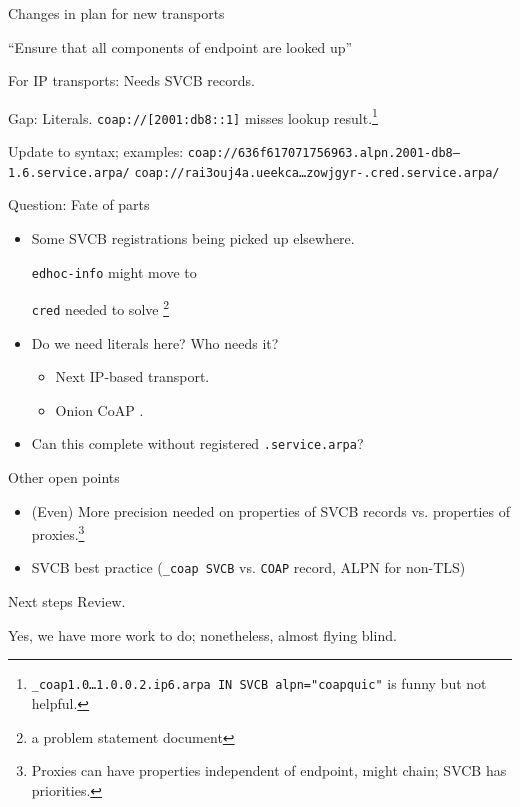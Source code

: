 \begin{frame}{Changes in plan for new transports}\Large
    {\color{gray}
    ``Ensure that all components of endpoint are looked up''

    \bigskip

    For IP transports: Needs SVCB records.

    \bigskip

    Gap: Literals. \texttt{coap://[2001:db8::1]} misses lookup result.\footnote{
        \texttt{\_coap1.0…1.0.0.2.ip6.arpa IN SVCB alpn="coapquic"} is funny but not helpful.}
    }

    \vspace{1cm}

    Update to syntax; examples:
    \texttt{coap://636f617071756963.alpn.2001-db8--1.6.service.arpa/}
    \texttt{coap://rai3ouj4a.ueekca…zowjgyr-.cred.service.arpa/}
\end{frame}

\begin{frame}{Question: Fate of parts}\Large
    \begin{itemize}
        \item Some SVCB registrations being picked up elsewhere.
            \bigskip

            \texttt{edhoc-info} might move to 

            \texttt{cred} needed to solve \footnote{a problem statement document}

            \bigskip
        \item Do we need literals here? Who needs it?
            \begin{itemize}\Large
                \item Next IP-based transport.
                \item Onion CoAP .
            \end{itemize}
            \bigskip

        \item Can this complete without registered \texttt{.service.arpa}?
    \end{itemize}
\end{frame}

\begin{frame}{Other open points}\Large
    \begin{itemize}
        \item (Even) More precision needed on properties of SVCB records vs. properties of proxies.\footnote{Proxies can have properties independent of endpoint, might chain; SVCB has priorities.}
            \bigskip
        \item SVCB best practice (\texttt{\_coap SVCB} vs. \texttt{COAP} record, ALPN for non-TLS)
    \end{itemize}
\end{frame}

\begin{frame}{Next steps}\Huge
    Review.

    \vspace{2cm}
    
    \large
    Yes, we have more work to do; nonetheless, almost flying blind.
\end{frame}



